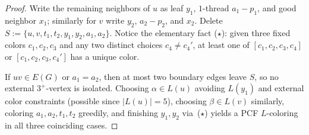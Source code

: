 \documentclass[11pt,a4paper]{article}
\theoremstyle{definition}
\begin{document}
\begin{proof}
Write the remaining neighbors of $u$ as leaf $y_1$, $1$-thread $a_1 - p_1$, and good neighbor $x_1$; similarly for $v$ write $y_2$, $a_2 - p_2$, and $x_2$. Delete $S := \{u, v, t_1, t_2, y_1, y_2, a_1, a_2\}$. Notice the elementary fact ($\star$): given three fixed colors $c_1, c_2, c_3$ and any two distinct choices $c_4 \neq c_4'$, at least one of $[c_1, c_2, c_3, c_4]$ or $[c_1, c_2, c_3, c_4']$ has a unique color.

If $uv \in E(G)$ or $a_1 = a_2$, then at most two boundary edges leave $S$, so no external $3^+$-vertex is isolated. Choosing $\alpha \in L(u)$ avoiding $L(y_1)$ and external color constraints (possible since $|L(u)| = 5$), choosing $\beta \in L(v)$ similarly, coloring $a_1, a_2, t_1, t_2$ greedily, and finishing $y_1, y_2$ via~($\star$) yields a PCF $L$-coloring in all three coinciding cases.


\end{proof}
\end{document}
